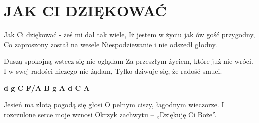 \documentclass[../../../songbook.tex]{subfiles}
\begin{document}
\TabPositions{8cm} %
\section*{JAK CI DZIĘKOWAĆ}
{}
\vspace{0.5cm}
Jak Ci dziękować - żeś mi dał tak wiele,	  \newline
Iż jestem w życiu jak ów gość przygodny,	  \newline
Co zaproszony został na wesele			 \newline
Niespodziewanie i nie odszedł głodny.		 \newline

Duszą spokojną wstecz się nie oglądam		\newline
Za przeszłym życiem, które już nie wróci.	\newline
I w swej radości niczego nie żądam,			\newline
Tylko dziwuje się, że radość smuci.		 \newline
 	
{\color{red}\textbf{d g C  F/A  B g A d C A} } \newline	

Jesień ma złotą pogodą się głosi			\newline	
O pełnym ciszy, łagodnym wieczorze.		\newline
I rozczulone serce moje wznosi			\newline
Okrzyk zachwytu – „Dziękuję Ci Boże”.		 \newline
\end{document}
